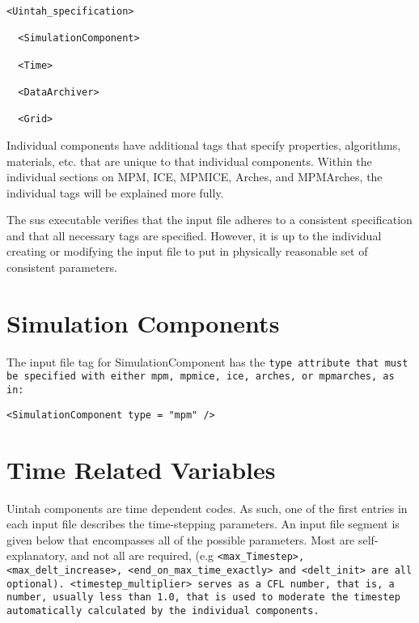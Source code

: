 \begin{Verbatim}[fontsize=\footnotesize]
  <Uintah_specification>

  <SimulationComponent>

  <Time>

  <DataArchiver>

  <Grid>
\end{Verbatim}


Individual components have additional tags that specify properties,
algorithms, materials, etc. that are unique to that individual
components.  Within the individual sections on MPM, ICE, MPMICE,
Arches, and MPMArches, the individual tags will be explained more
fully.

The sus executable verifies that the input file adheres to a consistent
specification and that all necessary tags are specified.  However, it
is up to the individual creating or modifying the input file to put in
physically reasonable set of consistent parameters.


\section{Simulation Components} \label{Sec:SimulationComponent}

The input file tag for SimulationComponent has the \tt type \normalfont
attribute that must be specified with either \tt mpm, mpmice, ice, arches,
\normalfont or \tt mpmarches, \normalfont as in:

\begin{Verbatim}[fontsize=\footnotesize]
<SimulationComponent type = "mpm" />
\end{Verbatim}



\section{Time Related Variables} \label{Sec:TimeRelatedVariables}
Uintah components are time dependent codes.  As such, one of the first
entries in each input file describes the time-stepping parameters.  An
input file segment is given below that encompasses all of the possible
parameters.  Most are self-explanatory, and not all are required, (e.g
\tt <max\_Timestep>, <max\_delt\_increase>,
<end\_on\_max\_time\_exactly> \normalfont and \tt <delt\_init>
\normalfont are all optional).  \tt <timestep\_multiplier> \normalfont
serves as a CFL number, that is, a number, usually less than 1.0, that
is used to moderate the timestep automatically calculated by the
individual components.

